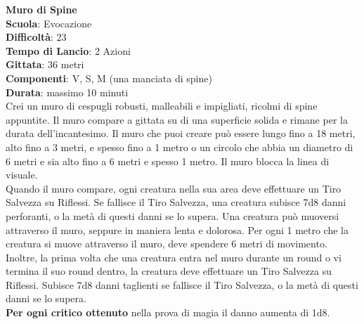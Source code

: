 \begin{multicols}{2}
\medskip\textbf{Muro di Spine}\\
\textbf{Scuola}: Evocazione\\
\textbf{Difficoltà}:  23\\
\textbf{Tempo di Lancio}: 2 Azioni\\
\textbf{Gittata}: 36 metri\\
\textbf{Componenti}: V, S, M (una manciata di spine)\\
\textbf{Durata}: massimo 10 minuti\\
Crei un muro di cespugli robusti, malleabili e impigliati, ricolmi di spine appuntite. Il muro compare a gittata su di una superficie solida e rimane per la durata dell'incantesimo. Il muro che puoi creare può essere lungo fino a 18 metri, alto fino a 3 metri, e spesso fino a 1 metro o un circolo che abbia un diametro di 6 metri e sia alto fino a 6 metri e spesso 1 metro. Il muro blocca la linea di visuale.\\
Quando il muro compare, ogni creatura nella sua area deve effettuare un Tiro Salvezza su Riflessi. Se fallisce il Tiro Salvezza, una creatura subisce 7d8 danni perforanti, o la metà di questi danni se lo supera. Una creatura può muoversi attraverso il muro, seppure in maniera lenta e dolorosa. Per ogni 1 metro che la creatura si muove attraverso il muro, deve spendere 6 metri di movimento. Inoltre, la prima volta che una creatura entra nel muro durante un round o vi termina il suo round dentro, la creatura deve effettuare un Tiro Salvezza su Riflessi. Subisce 7d8 danni taglienti se fallisce il Tiro Salvezza, o la metà di questi danni se lo supera.\\
\textbf{Per ogni critico ottenuto} nella prova di magia il danno aumenta di 1d8.


\end{multicols}
